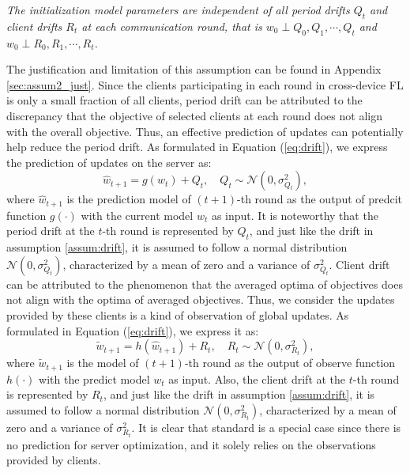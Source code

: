 \begin{assumption}\label{assum:wqr}
   \textit{The initialization model parameters are independent of all period drifts $Q_t$ and client drifts $R_t$ at each communication round, that is $w_0 \perp Q_0, Q_1,\cdots, Q_t$ and $w_0 \perp R_0,  R_1,\cdots, R_t$.}
   \end{assumption}
The justification and limitation of this assumption can be found in Appendix \ref{sec:assum2_just}.
Since the clients participating in each round in cross-device FL is only a small fraction of all clients, 
period drift can be attributed to the discrepancy that the objective of selected clients at each round does not align with the overall objective. Thus, an effective prediction of updates can potentially help reduce the period drift. As formulated in Equation (\ref{eq:drift}), we express the prediction of updates on the server as:
\begin{equation}\label{eq:predict}
   \hat{w}_{t+1}=g(w_{t})+Q_{t}, \quad Q_{t} \sim \mathcal{N}(0,\sigma_{Q_t}^2),
\end{equation}
where $\hat{w}_{t+1}$ is the prediction model of $(t+1)$-th round as the output of predcit function $g(\cdot)$ with the current model $w_{t}$ as input. It is noteworthy that the period drift at the $t$-th round is represented by $Q_{t}$, and just like the drift in assumption \ref{assum:drift}, it is assumed to follow a normal distribution $\mathcal{N}(0,\sigma_{Q_t}^2)$, characterized by a mean of zero and a variance of $\sigma_{Q_t}^2$. Client drift can be attributed to the phenomenon that the averaged optima of objectives does not align with the optima of averaged objectives. Thus, we consider the updates provided by these clients is a kind of observation of global updates. As formulated in Equation (\ref{eq:drift}), we express it as:
\begin{equation}\label{eq:observe}
\tilde{w}_{t+1} =h(\hat{w}_{t+1})+R_{t},\quad R_{t} \sim \mathcal{N}(0,\sigma_{R_t}^2),
\end{equation}
where $\tilde{w}_{t+1} $ is the model of $(t+1)$-th round as the output of observe function $h(\cdot)$ with the predict model $w_{t}$ as input. Also, the client drift at the $t$-th round is represented by $R_{t}$, and just like the drift in assumption \ref{assum:drift}, it is assumed to follow a normal distribution $\mathcal{N}(0,\sigma_{R_t}^2)$, characterized by a mean of zero and a variance of $\sigma_{R_t}^2$. It is clear that standard \fedavg is a special case since there is no prediction for server optimization, and it solely relies on the observations provided by clients.
